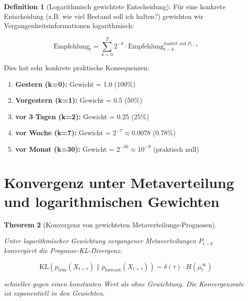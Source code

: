 \documentclass[12pt, a4paper, titlepage]{report}
\newtheorem{theorem}{Theorem}[section]
\theoremstyle{definition}
\newtheorem{definition}[theorem]{Definition}
\theoremstyle{remark}
\newcommand{\KL}{\mathrm{KL}}
\begin{document}
\begin{definition}[Logarithmisch gewichtete Entscheidung]
Für eine konkrete Entscheidung (z.B. wie viel Bestand soll ich halten?) gewichten wir Vergangenheitsinformationen logarithmisch:

\begin{equation}
\text{Empfehlung}_t = \sum_{k=0}^{T} 2^{-k} \cdot \text{Empfehlung}_{t-k}^{\text{basiert auf } P_{t-k}}
\label{eq:adaptive_decision}
\end{equation}

\end{definition}

Dies hat sehr konkrete praktische Konsequenzen:

\begin{enumerate}
  \item \textbf{Gestern (k=0):} Gewicht = 1.0 (100\%)
  \item \textbf{Vorgestern (k=1):} Gewicht = 0.5 (50\%)
  \item \textbf{vor 3 Tagen (k=2):} Gewicht = 0.25 (25\%)
  \item \textbf{vor Woche (k=7):} Gewicht = $2^{-7} \approx 0.0078$ (0.78\%)
  \item \textbf{vor Monat (k=30):} Gewicht = $2^{-30} \approx 10^{-9}$ (praktisch null)
\end{enumerate}

\section{Konvergenz unter Metaverteilung und logarithmischen Gewichten}

\begin{theorem}[Konvergenz von gewichteten Metaverteilungs-Prognosen]
\label{thm:convergence_meta_weighted}

Unter logarithmischer Gewichtung vergangener Metaverteilungen $P_{t-k}$ konvergiert die Prognose-KL-Divergenz:

\begin{equation}
\KL(p_{\text{true}}(X_{t+\tau}) \parallel p_{\text{forecast}}(X_{t+\tau})) \sim \delta(\tau) \cdot H(\mu_t^{\infty})
\label{eq:convergence_rate}
\end{equation}

schneller gegen einen konstanten Wert als ohne Gewichtung. Die Konvergenzrate ist exponentiell in den Gewichten.
\end{theorem}
\end{document}
